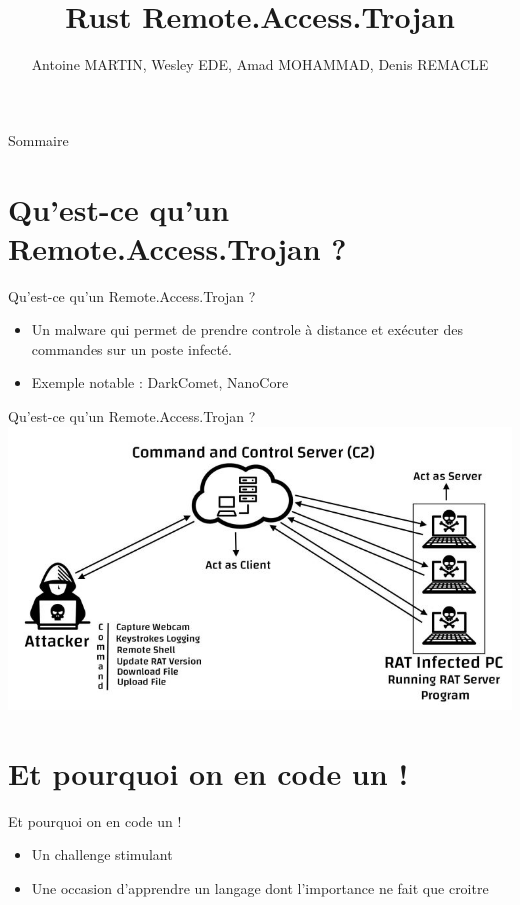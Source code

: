 \documentclass{beamer}
\title{Rust Remote.Access.Trojan}
\author{Antoine MARTIN, Wesley EDE, Amad MOHAMMAD, Denis REMACLE}
\begin{document}
  \begin{frame}
 \maketitle
  \end{frame}

\begin{frame}{Sommaire}
    \tableofcontents
\end{frame}

\section{Qu'est-ce qu'un Remote.Access.Trojan ?}
  \begin{frame}{Qu'est-ce qu'un Remote.Access.Trojan ?}
  \begin{itemize}
	\item Un malware qui permet de prendre controle à distance et exécuter des commandes sur un poste infecté.
	\item Exemple notable : DarkComet, NanoCore
  \end{itemize}
  \end{frame}

  \begin{frame}{Qu'est-ce qu'un Remote.Access.Trojan ?}
\includegraphics[scale=.4]{Schema.jpg}
  \end{frame}

\section{Et pourquoi on en code un !}
  \begin{frame}{Et pourquoi on en code un !}
  \begin{itemize}
	\item Un challenge stimulant
	\item Une occasion d'apprendre un langage dont l'importance ne fait que croitre
  \end{itemize}
  \end{frame}
\end{document}
